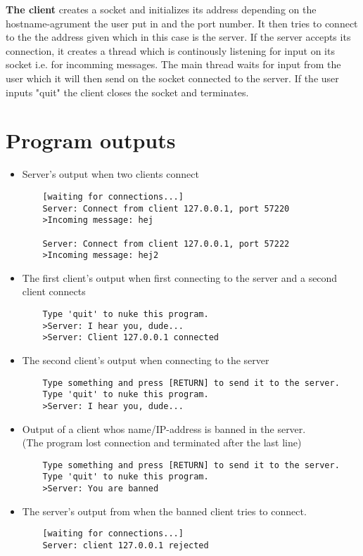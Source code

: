\documentclass{article}
\begin{document}
\textbf{The client} creates a socket and initializes its address depending on the hostname-agrument the user put in and the port number. It then tries to connect to the the address given which in this case is the server. If the server accepts its connection, it creates a thread which is continously listening for input on its socket i.e. for incomming messages. The main thread waits for input from the user which it will then send on the socket connected to the server. If the user inputs "quit" the client closes the socket and terminates.

\onecolumn
\section{Program outputs}
\begin{itemize}
    \item Server's output when two clients connect
    \begin{verbatim}
    [waiting for connections...]
    Server: Connect from client 127.0.0.1, port 57220
    >Incoming message: hej

    Server: Connect from client 127.0.0.1, port 57222
    >Incoming message: hej2
    \end{verbatim}
\item The first client's output when first connecting to the server and a second client connects
    \begin{verbatim}
    Type 'quit' to nuke this program.
    >Server: I hear you, dude...
    >Server: Client 127.0.0.1 connected
    \end{verbatim}

\item The second client's output when connecting to the server
    \begin{verbatim}
    Type something and press [RETURN] to send it to the server.
    Type 'quit' to nuke this program.
    >Server: I hear you, dude...
    \end{verbatim}

\item Output of a client whos name/IP-address is banned in the server.\\(The program lost connection and terminated after the last line)
    \begin{verbatim}
    Type something and press [RETURN] to send it to the server.
    Type 'quit' to nuke this program.
    >Server: You are banned
    \end{verbatim}

\item The server's output from when the banned client tries to connect.
    \begin{verbatim}
    [waiting for connections...]
    Server: client 127.0.0.1 rejected
    \end{verbatim}
\end{itemize}
\end{document}
